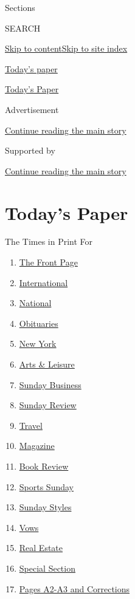 Sections

SEARCH

\protect\hyperlink{site-content}{Skip to
content}\protect\hyperlink{site-index}{Skip to site index}

\href{https://www.nytimes3xbfgragh.onion/section/todayspaper}{Today's
paper}

\href{https://myaccount.nytimes3xbfgragh.onion/auth/login?response_type=cookie\&client_id=vi}{}

\href{https://www.nytimes3xbfgragh.onion/section/todayspaper}{Today's
Paper}

Advertisement

\protect\hyperlink{after-top}{Continue reading the main story}

Supported by

\protect\hyperlink{after-sponsor}{Continue reading the main story}

\hypertarget{todays-paper}{%
\section{Today's Paper}\label{todays-paper}}

The Times in Print For

\begin{enumerate}
\def\labelenumi{\arabic{enumi}.}
\tightlist
\item
  \protect\hyperlink{thefrontpage}{The Front Page}
\item
  \protect\hyperlink{international}{International}
\item
  \protect\hyperlink{national}{National}
\item
  \protect\hyperlink{obituaries}{Obituaries}
\item
  \protect\hyperlink{newyork}{New York}
\item
  \protect\hyperlink{artsux5cux26leisure}{Arts \& Leisure}
\item
  \protect\hyperlink{sundaybusiness}{Sunday Business}
\item
  \protect\hyperlink{sundayreview}{Sunday Review}
\item
  \protect\hyperlink{travel}{Travel}
\item
  \protect\hyperlink{magazine}{Magazine}
\item
  \protect\hyperlink{bookreview}{Book Review}
\item
  \protect\hyperlink{sportssunday}{Sports Sunday}
\item
  \protect\hyperlink{sundaystyles}{Sunday Styles}
\item
  \protect\hyperlink{vows}{Vows}
\item
  \protect\hyperlink{realestate}{Real Estate}
\item
  \protect\hyperlink{specialsection}{Special Section}
\item
  \protect\hyperlink{pagesa2-a3andcorrections}{Pages A2-A3 and
  Corrections}
\end{enumerate}

